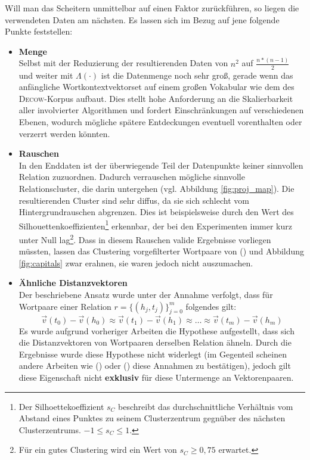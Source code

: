 Will man das Scheitern unmittelbar auf einen Faktor zurückführen, so liegen die verwendeten Daten am nächsten.
Es lassen sich im Bezug auf jene folgende Punkte feststellen:
\begin{itemize}
  \item \textbf{Menge}\\ Selbst mit der Reduzierung der resultierenden Daten von $n^2$ auf $\frac{n*(n-1)}{2}$ und weiter
  mit $\Lambda(\cdot)$ ist die
  Datenmenge noch sehr groß, gerade wenn das anfängliche Wortkontextvektorset auf einem großen Vokabular wie dem des \textsc{Decow}-Korpus aufbaut.
  Dies stellt hohe Anforderung an die Skalierbarkeit aller involvierter Algorithmen und fordert Einschränkungen auf verschiedenen
  Ebenen, wodurch mögliche spätere Entdeckungen eventuell vorenthalten oder verzerrt werden könnten.
  \item \textbf{Rauschen}\\ In den Enddaten ist der überwiegende Teil der Datenpunkte keiner sinnvollen Relation zuzuordnen.
  Dadurch verrauschen mögliche sinnvolle Relationscluster, die darin untergehen (vgl. Abbildung \ref{fig:proj_map}). Die resultierenden Cluster sind sehr
  diffus, da sie sich schlecht vom Hintergrundrauschen abgrenzen. Dies ist beispielsweise durch den Wert des Silhouettenkoeffizienten\footnote{
  Der Silhoettekoeffizient $s_C$ beschreibt das durchschnittliche Verhältnis vom Abstand eines Punktes zu seinem Clusterzentrum gegnüber
  des nächsten Clusterzentrums. $-1 \leq s_C \leq 1$.}
  erkennbar, der bei den Experimenten immer kurz unter Null lag\footnote{Für ein gutes Clustering wird ein Wert von $s_C \geq 0,75$
  erwartet.}. Dass in diesem Rauschen valide Ergebnisse vorliegen müssten, lassen das Clustering vorgefilterter Wortpaare von (\cite{fu2014learning}) und Abbildung \ref{fig:capitals}
  zwar erahnen, sie waren jedoch nicht auszumachen.
  \item \textbf{Ähnliche Distanzvektoren}\\
  Der beschriebene Ansatz wurde unter der Annahme verfolgt, dass für Wortpaare einer Relation $r=\{(h_j, t_j)\}_{j=0}^m$
  folgendes gilt:
  \begin{equation}
    \vec{v}(t_0) - \vec{v}(h_0) \approx \vec{v}(t_1) - \vec{v}(h_1) \approx \ldots \approx \vec{v}(t_m) - \vec{v}(h_m)
  \end{equation}
  Es wurde aufgrund vorheriger Arbeiten die Hypothese aufgestellt, dass sich die Distanzvektoren von
  Wortpaaren derselben Relation ähneln. Durch die Ergebnisse wurde diese Hypothese nicht widerlegt (im Gegenteil scheinen
  andere Arbeiten wie (\cite{bordes2013translating}) oder (\cite{lin2015learning}) diese Annahmen zu bestätigen), jedoch
  gilt diese Eigenschaft nicht \textbf{exklusiv} für diese Untermenge an Vektorenpaaren.\\


\end{itemize}
